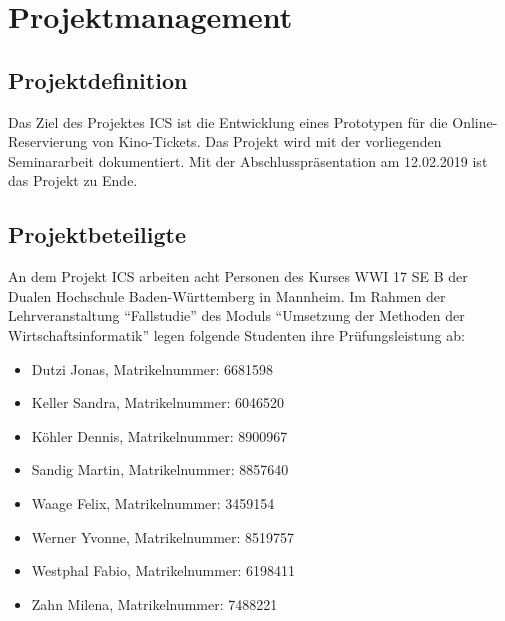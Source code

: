 \chapter{Projektmanagement}
	
	\section{Projektdefinition}
	Das Ziel des Projektes \ac{ICS} ist die Entwicklung eines Prototypen für die Online-Reservierung von Kino-Tickets. Das Projekt wird mit der vorliegenden Seminararbeit dokumentiert. Mit der Abschlusspräsentation am 12.02.2019 ist das Projekt zu Ende.
	
	\section{Projektbeteiligte}
	An dem Projekt \ac{ICS} arbeiten acht Personen des Kurses WWI 17 SE B der Dualen Hochschule Baden-Württemberg in Mannheim. Im Rahmen der Lehrveranstaltung \enquote{Fallstudie} des Moduls \enquote{Umsetzung der Methoden der Wirtschaftsinformatik} legen folgende Studenten ihre Prüfungsleistung ab:
	\begin{singlespacing}
	\begin{itemize}
		\item Dutzi Jonas, Matrikelnummer: 6681598
		\item Keller Sandra, Matrikelnummer: 6046520 
		\item Köhler Dennis, Matrikelnummer: 8900967 
		\item Sandig Martin, Matrikelnummer: 8857640 
		\item Waage Felix, Matrikelnummer: 3459154 
		\item Werner Yvonne, Matrikelnummer: 8519757 
		\item Westphal Fabio, Matrikelnummer: 6198411  
		\item Zahn Milena, Matrikelnummer: 7488221 
	\end{itemize}
	\end{singlespacing}

